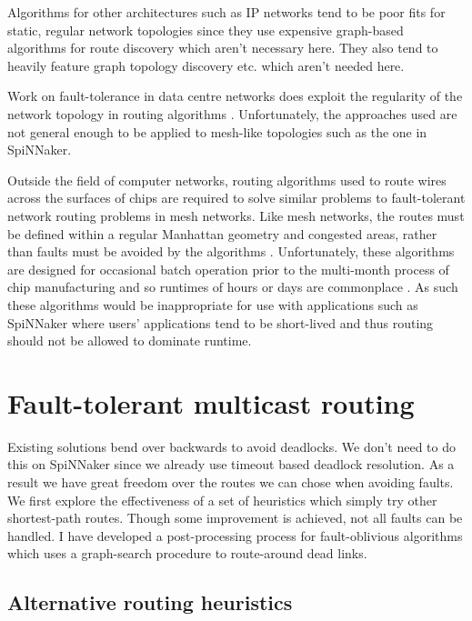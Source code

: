 			Algorithms for other architectures such as IP networks tend to be poor fits
			for static, regular network topologies since they use expensive graph-based
			algorithms for route discovery which aren't necessary here. They also tend
			to heavily feature graph topology discovery etc. which aren't needed here.
			
			Work on fault-tolerance in data centre networks does exploit the regularity
			of the network topology in routing algorithms \cite{guo08,liao12}.
			Unfortunately, the approaches used are not general enough to be applied to
			mesh-like topologies such as the one in SpiNNaker.
			
			Outside the field of computer networks, routing algorithms used to route
			wires across the surfaces of chips are required to solve similar problems
			to fault-tolerant network routing problems in mesh networks. Like mesh
			networks, the routes must be defined within a regular Manhattan geometry
			and congested areas, rather than faults must be avoided by the algorithms
			\cite{kahng11}.  Unfortunately, these algorithms are designed for
			occasional batch operation prior to the multi-month process of chip
			manufacturing and so runtimes of hours or days are commonplace
			\cite{nam08}. As such these algorithms would be inappropriate for use with
			applications such as SpiNNaker where users' applications tend to be
			short-lived and thus routing should not be allowed to dominate runtime.
	
	\section{Fault-tolerant multicast routing}
		
		Existing solutions bend over backwards to avoid deadlocks. We don't need to
		do this on SpiNNaker since we already use timeout based deadlock
		resolution. As a result we have great freedom over the routes we can chose
		when avoiding faults. We first explore the effectiveness of a set of
		heuristics which simply try other shortest-path routes. Though some
		improvement is achieved, not all faults can be handled. I have developed a
		post-processing process for fault-oblivious algorithms which uses a
		graph-search procedure to route-around dead links.
		
		\subsection{Alternative routing heuristics}
			
